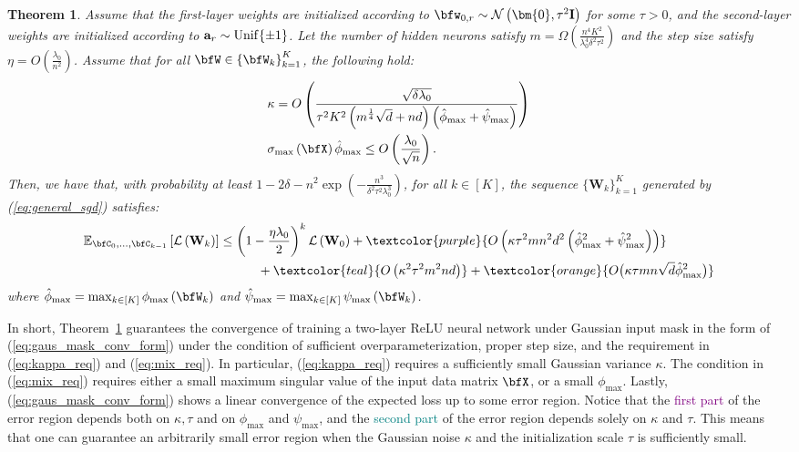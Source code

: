 \documentclass[10pt]{article} %
\newtheorem{theorem}{Theorem}[section]
\theoremstyle{definition}
\theoremstyle{plain}
\newcommand{\paren}[1]{\left(#1\right)}
\providecommand{\E}{\mathbb{E}}
\def\calL{{\mathcal{L}}}
\def\bfI{{\mathbf{I}}}\def\bfJ{{\mathbf{J}}}\def\bfK{{\mathbf{K}}}\def\bfL{{\mathbf{L}}}
\def\bfa{{\mathbf{a}}}\def\bfb{{\mathbf{b}}}\def\bfc{{\mathbf{c}}}\def\bfd{{\mathbf{d}}}
\begin{document}
\begin{theorem}
    \label{thm:conv_gaussian_mask}
    Assume that the first-layer weights are initialized according to $\bfw_{0,r}\sim\mathcal{N}\paren{\bm{0}, \tau^2\bfI}$ for some $\tau > 0$, and the second-layer weights are initialized according to $\bfa_r\sim{\rm Unif}\{\pm 1\}$. Let the number of hidden neurons satisfy $m = \Omega\paren{\frac{n^4K^2}{\lambda_0^4\delta^2\tau^2}}$ and the step size satisfy $\eta = O\paren{\frac{\lambda_0}{n^2}}$. Assume that for all $\bfW\in\left\{\bfW_k\right\}_{k=1}^K$, the following hold:
    \begin{align}
        \label{eq:kappa_req}
        &\kappa = O\paren{\frac{\sqrt{\delta\lambda_0}}{\tau^2K^2\paren{m^{\frac{1}{4}}\sqrt{d}+nd}\paren{\hat{\phi}_{\max}+\hat{\psi}_{\max}}}} \\
        \label{eq:mix_req}
&\sigma_{\max}\paren{\bfX}\hat{\phi}_{\max}\leq O\paren{\frac{\lambda_0}{\sqrt{n}}}.
    \end{align}
    Then, we have that, with probability at least $1 - 2\delta - n^2\exp\paren{-\frac{n^3}{\delta^2\tau^2\lambda_0^3}}$, for all $k\in[K]$, the sequence $\{\mathbf{W}_k\}_{k=1}^K$ generated by (\ref{eq:general_sgd}) satisfies:
    \begin{align}
        \label{eq:gaus_mask_conv_form}
            \E_{\bfC_0,\dots,\bfC_{k-1}}\left[\calL\paren{\mathbf{W}_k}\right] &\leq \paren{1 - \frac{\eta\lambda_0}{2}}^k\calL\paren{\mathbf{W}_0} + \textcolor{purple}{O\paren{\kappa\tau^2mn^2d^2\paren{\hat{\phi}_{\max}^2 + \hat{\psi}_{\max}^2}}} \\ &\quad \quad \quad + \textcolor{teal}{O\paren{\kappa^2\tau^2m^2nd}} + \textcolor{orange}{O\big(\kappa\tau m n \sqrt{d}  \hat\phi_{\max}^2\big)}        
    \end{align}
    where $\hat{\phi}_{\max} = \max_{k\in[K]}\phi_{\max}\paren{\bfW_k}$ and $\hat{\psi}_{\max} = \max_{k\in[K]}\psi_{\max}\paren{\bfW_k}$.
\end{theorem}

In short, Theorem~\ref{thm:conv_gaussian_mask} guarantees the convergence of training a two-layer ReLU neural network under Gaussian input mask in the form of (\ref{eq:gaus_mask_conv_form}) under the condition of sufficient overparameterization, proper step size, and the requirement in (\ref{eq:kappa_req}) and (\ref{eq:mix_req}). 
In particular, (\ref{eq:kappa_req}) requires a sufficiently small Gaussian variance $\kappa$. 
The condition in (\ref{eq:mix_req}) requires either a small maximum singular value of the input data matrix $\bfX$, or a small $\phi_{\max}$. 
Lastly, (\ref{eq:gaus_mask_conv_form}) shows a linear convergence of the expected loss up to some error region. 
Notice that the \textcolor{purple}{first part} of the error region depends both on $\kappa,\tau$ and on $\phi_{\max}$ and $\psi_{\max}$, and the \textcolor{teal}{second part} of the error region depends solely on $\kappa$ and $\tau$. 
This means that one can guarantee an arbitrarily small error region when the Gaussian noise $\kappa$ and the initialization scale $\tau$ is sufficiently small.
\end{document}
